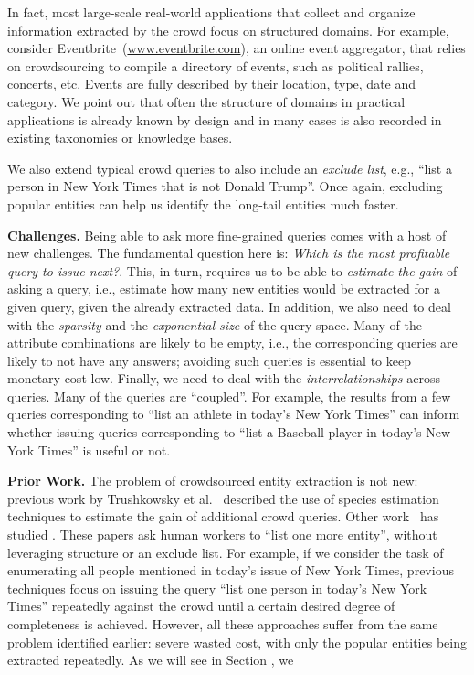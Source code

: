 In fact, most large-scale real-world applications that collect and organize information extracted by the crowd focus on structured domains. For example, consider Eventbrite~(\url{www.eventbrite.com}), an online event aggregator, that relies on crowdsourcing to compile a directory of events, such as political rallies, concerts, etc. Events are fully described by their location, type, date and category. We point out that often the structure of domains in practical applications is already known by design and in many cases is also recorded in existing taxonomies or knowledge bases. 


We also extend typical crowd queries to also include an {\em exclude list}, 
e.g., ``list a person in New York Times that is not Donald Trump''. 
Once again, excluding popular entities can help us identify
the long-tail entities much faster.



\noindent
{\bf Challenges.} 
Being able to ask more fine-grained queries comes with a host of new challenges. The fundamental question here is: {\em Which is the most profitable query to issue next?}. This, in turn, requires us to be able to {\em estimate the gain} of asking a query, i.e., estimate how many new entities would be extracted for a given query, given the already extracted data. In addition, we also need to deal with the {\em sparsity} and the {\em exponential size} of the query space. Many of the attribute combinations are likely to be empty, i.e., the corresponding queries are likely to not have any answers; avoiding such queries is essential to keep monetary cost low. Finally, we need to deal with the {\em interrelationships} across queries. Many of the queries are ``coupled''. For example, the results from a few queries corresponding to ``list an athlete in today's New York Times'' can inform whether issuing queries corresponding to ``list a Baseball player in today's New York Times'' is useful or not. 




\noindent
{\bf Prior Work.}
The problem of crowdsourced entity extraction is not new: previous work by Trushkowsky et al.~\cite{trushkowsky:2013}
described the use of species estimation techniques to estimate the gain of additional crowd queries. 
Other work~\cite{amsterdamer:2014} has studied .
These papers ask human workers to ``list one more entity'', without leveraging structure or an exclude list. 
For example, if we consider the task of enumerating all people mentioned in today's issue of New York Times, 
previous techniques focus on issuing the query ``list one person in today's New York Times'' repeatedly against 
the crowd until a certain desired degree of completeness is achieved.
However, all these approaches suffer from the same problem identified earlier: severe wasted cost,
with only the popular entities being extracted repeatedly.
As we will see in Section , we 

